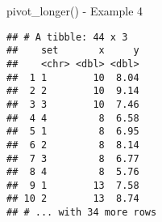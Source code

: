 \documentclass[
  ignorenonframetext,
]{beamer}
\newenvironment{Shaded}{\begin{snugshade}}{\end{snugshade}}
\newcommand{\DataTypeTok}[1]{\textcolor[rgb]{0.13,0.29,0.53}{#1}}
\newcommand{\KeywordTok}[1]{\textcolor[rgb]{0.13,0.29,0.53}{\textbf{#1}}}
\newcommand{\NormalTok}[1]{#1}
\newcommand{\OperatorTok}[1]{\textcolor[rgb]{0.81,0.36,0.00}{\textbf{#1}}}
\newcommand{\StringTok}[1]{\textcolor[rgb]{0.31,0.60,0.02}{#1}}
\begin{document}
\begin{frame}[fragile]{pivot\_longer() - Example 4}
\protect\hypertarget{pivot_longer---example-4-1}{}

\begin{Shaded}
\end{Shaded}

\begin{verbatim}
## # A tibble: 44 x 3
##    set       x     y
##    <chr> <dbl> <dbl>
##  1 1        10  8.04
##  2 2        10  9.14
##  3 3        10  7.46
##  4 4         8  6.58
##  5 1         8  6.95
##  6 2         8  8.14
##  7 3         8  6.77
##  8 4         8  5.76
##  9 1        13  7.58
## 10 2        13  8.74
## # ... with 34 more rows
\end{verbatim}

\end{frame}
\end{document}
